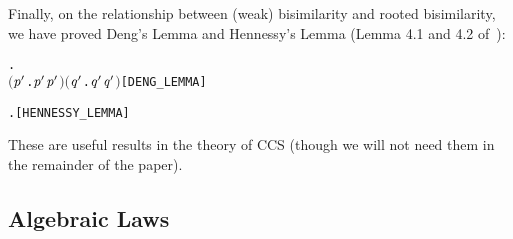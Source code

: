 Finally, on the relationship between (weak) bisimilarity and rooted bisimilarity, 
we have proved Deng's Lemma and Hennessy's Lemma
(Lemma 4.1 and 4.2 of~\citep[p.~176,~178]{Gorrieri:2015jt}):
\begin{alltt}
\HOLTokenTurnstile{} \HOLSymConst{\HOLTokenForall{}} .
        \HOLSymConst{\HOLTokenWeakEQ}  \HOLSymConst{\HOLTokenImp{}}
       \ensuremath{(}\HOLSymConst{\HOLTokenExists{}}\ensuremath{\HOLBoundVar{p}\sp{\prime}}.  \HOLTokenTransBegin\HOLSymConst{\ensuremath{\tau}}\HOLTokenTransEnd \ensuremath{\HOLBoundVar{p}\sp{\prime}} \HOLSymConst{\HOLTokenConj{}} \ensuremath{\HOLBoundVar{p}\sp{\prime}} \HOLSymConst{\HOLTokenWeakEQ} \ensuremath{)} \HOLSymConst{\HOLTokenDisj{}} \ensuremath{(}\HOLSymConst{\HOLTokenExists{}}\ensuremath{\HOLBoundVar{q}\sp{\prime}}.  \HOLTokenTransBegin\HOLSymConst{\ensuremath{\tau}}\HOLTokenTransEnd \ensuremath{\HOLBoundVar{q}\sp{\prime}} \HOLSymConst{\HOLTokenConj{}}  \HOLSymConst{\HOLTokenWeakEQ} \ensuremath{\HOLBoundVar{q}\sp{\prime}}\ensuremath{)} \HOLSymConst{\HOLTokenDisj{}}  \HOLSymConst{\HOLTokenObsCongr} \hfill{[DENG_LEMMA]}
  
\HOLTokenTurnstile{} \HOLSymConst{\HOLTokenForall{}} .  \HOLSymConst{\HOLTokenWeakEQ}  \HOLSymConst{\HOLTokenEquiv{}}  \HOLSymConst{\HOLTokenObsCongr}  \HOLSymConst{\HOLTokenDisj{}}  \HOLSymConst{\HOLTokenObsCongr} \HOLSymConst{\ensuremath{\tau}}\HOLSymConst{\ensuremath{\ldotp}} \HOLSymConst{\HOLTokenDisj{}} \HOLSymConst{\ensuremath{\tau}}\HOLSymConst{\ensuremath{\ldotp}} \HOLSymConst{\HOLTokenObsCongr} \hfill{[HENNESSY_LEMMA]}
\end{alltt}
These are useful results in the theory of CCS (though we will not need them in the
  remainder of the paper).

\subsection{Algebraic Laws}
\label{ss:alaws}

